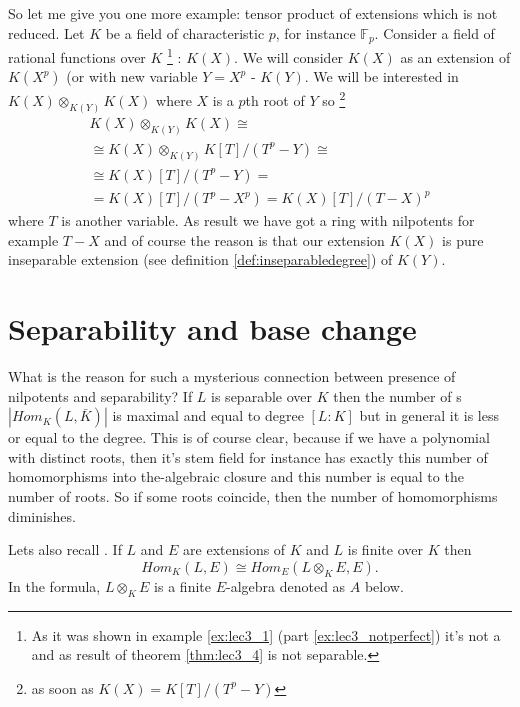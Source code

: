 So let me give you one more example: tensor product of
extensions which is not reduced. Let $K$ be a field of characteristic
$p$, for instance $\mathbb{F}_p$. Consider a field of rational
functions over $K$
\footnote{
  As it was shown in example \ref{ex:lec3_1} (part
  \ref{ex:lec3_notperfect}) it's not a   and
  as result of theorem \ref{thm:lec3_4} is not separable.
}
: $K\left(X\right)$. We will consider
$K\left(X\right)$ as an extension of $K\left(X^p\right)$ (or with new
variable $Y = X^p$ - $K\left(Y\right)$. We will be interested in
\(
K\left(X\right)
\otimes_{K\left(Y\right)}
K\left(X\right)
\) where $X$ is a $p$th root of $Y$ so
\footnote{
  as soon as
  $K\left(X\right) = K\left[T\right]/\left(T^p - Y\right)$
}
\begin{eqnarray}
K\left(X\right)
\otimes_{K\left(Y\right)}
K\left(X\right)
\cong
\nonumber \\
\cong
K\left(X\right)
\otimes_{K\left(Y\right)}
K\left[T\right]/\left(T^p - Y\right)
\cong
\nonumber \\
\cong
K\left(X\right)\left[T\right]/\left(T^p - Y\right) =
\nonumber \\
=
K\left(X\right)\left[T\right]/\left(T^p - X^p\right) =
K\left(X\right)\left[T\right]/\left(T - X\right)^p
\nonumber
\end{eqnarray}
where $T$ is another variable. As result we have got a ring with
nilpotents for example $T - X$ and of course the reason is that our
extension $K\left(X\right)$ is pure inseparable extension (see
definition \ref{def:inseparabledegree}) of $K\left(Y\right)$.  

\section{Separability and base change}
What is the reason for such a mysterious connection between 
presence of nilpotents and separability? If $L$ is separable over $K$
then the number of s
$\left|Hom_K\left(L, \bar{K}\right)\right|$ is maximal and equal to
degree $\left[L : K\right]$ but in general it is less or equal to the
degree.  This is of course clear, because  if we have a polynomial
with distinct roots, then it's stem field for instance  has exactly
this number of  homomorphisms into the-algebraic closure and this
number is equal to the number of roots. So if some roots coincide,  
then the number of homomorphisms diminishes. 

Lets also recall . If $L$ and $E$ are
extensions of $K$ and $L$ is finite over $K$ then
\[
Hom_K\left(L, E\right) \cong
Hom_E\left(
L \otimes_K E, E
\right).
\]
In the formula, $L \otimes_K E$ is a finite $E$-algebra denoted as $A$
below.

